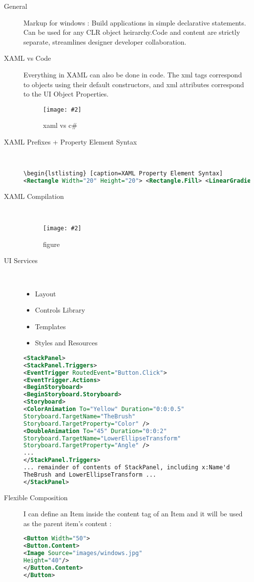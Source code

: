 \documentclass[a4paper,10pt]{scrreprt}
\newcommand{\pic}[2][figure]{\begin{figure}[h]
 \centering
 \texttt{[image: \#2]}
 \caption{#1}
\end{figure}
}
\begin{document}
\begin{description}
\item[General] Markup for windows : Build applications in simple declarative statements. Can be used for any CLR object heirarchy.Code and content are strictly separate, streamlines designer developer collaboration.
\item[XAML vs Code] Everything in XAML can also be done in code. The xml tags correspond to objects using their default constructors, and xml attributes correspond to the UI Object Properties.\\
\pic[xaml vs c\#]{xaml_cs.png}

\item [XAML Prefixes + Property Element Syntax] \hfill \\
\begin{lstlisting}[caption=XAML Prefixes,language=xml]
\begin{lstlisting} [caption=XAML Property Element Syntax]
<Rectangle Width="20" Height="20"> <Rectangle.Fill> <LinearGradientBrush> <GradientStop Color="Red" Offset="0" /> <GradientStop Color="Blue" Offset="1" /> </LinearGradientBrush> </Rectangle.Fill> </Rectangle>
\end{lstlisting}
\item [XAML Compilation] \hfill \\
\pic{xamlcomp.png}
\item [UI Services] \hfill \\
\begin{itemize}
 \item Layout
 \item Controls Library
 \item Templates
 \item Styles and Resources 
\end{itemize}
\begin{lstlisting}[language=xml,caption=Combination of UI Services Example]
<StackPanel>
<StackPanel.Triggers>
<EventTrigger RoutedEvent="Button.Click">
<EventTrigger.Actions>
<BeginStoryboard>
<BeginStoryboard.Storyboard>
<Storyboard>
<ColorAnimation To="Yellow" Duration="0:0:0.5"
Storyboard.TargetName="TheBrush"
Storyboard.TargetProperty="Color" />
<DoubleAnimation To="45" Duration="0:0:2"
Storyboard.TargetName="LowerEllipseTransform"
Storyboard.TargetProperty="Angle" />
...
</StackPanel.Triggers>
... remainder of contents of StackPanel, including x:Name'd
TheBrush and LowerEllipseTransform ...
</StackPanel>
\end{lstlisting}
\item [Flexible Composition] I can define an Item inside the content tag of an Item and it will be used as the parent item's content :
 \begin{lstlisting}[caption=XAML Composition Example,language=xml]
 <Button Width="50">
<Button.Content>
<Image Source="images/windows.jpg"
Height="40"/>
</Button.Content>
</Button>
 \end{lstlisting}
 

\end{description}
\end{document}
